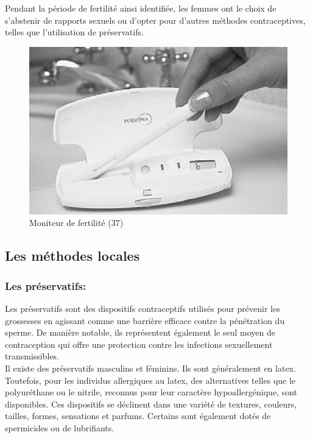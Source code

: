 \noindent Pendant la période de fertilité ainsi identifiée, les femmes ont le choix de s'abstenir de rapports sexuels ou d'opter pour d'autres méthodes contraceptives, telles que l'utilisation de préservatifs. \\

\begin{figure}[H]
  \centering
  \includegraphics{Images/fig_17.jpg}
  \caption{Moniteur de fertilité (37)}
\end{figure}

\subsection{Les méthodes locales}

\subsubsection{Les préservatifs:}

\noindent Les préservatifs sont des dispositifs contraceptifs utilisés pour prévenir les grossesses en agissant comme une barrière efficace contre la pénétration du sperme. De manière notable, ils représentent également le seul moyen de contraception qui offre une protection contre les infections sexuellement transmissibles. \\

\noindent Il existe des préservatifs masculins et féminins. Ils sont généralement en latex. Toutefois, pour les individus allergiques au latex, des alternatives telles que le polyuréthane ou le nitrile, reconnus pour leur caractère hypoallergénique, sont disponibles. Ces dispositifs se déclinent dans une variété de textures, couleurs, tailles, formes, sensations et parfums. Certains sont également dotés de spermicides ou de lubrifiants.\\

